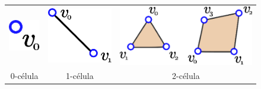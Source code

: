\begin{figure}[h]
\begin{center}
\begin{tabular}{ccc}
\includegraphics[angle=0,scale=0.45]{imagens/cap2/fig6-0.eps} & \hspace{0.5cm} \includegraphics[angle=0,scale=0.45]{imagens/cap2/fig6-1.eps} & \hspace{0.5cm}
 \includegraphics[angle=0,scale=0.2]{imagens/cap2/fig6-2.eps}\\
 0-célula & \hspace{0.5cm} 1-célula & \hspace{0.5cm} 2-célula\\
 \end{tabular} 
 \begin{tabular}{c}

\end{tabular}
\end{center}
\end{figure}

